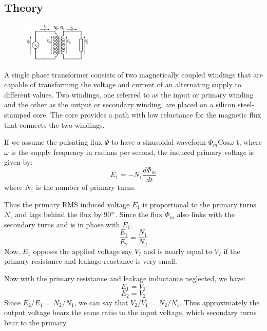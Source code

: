 \documentclass{article}
\begin{document}
\subsection{Theory}
\begin{figure}
\includegraphics[width=0.3\textwidth]{img1.png}
\end{figure}
A single phase transformer consists of two magnetically coupled windings that are capable of transforming the voltage and current of an alternating supply to different values. Two windings, one referred to as the input or primary winding and the other as the output or secondary winding, are placed on a silicon steel-stamped core. The core provides a path with low reluctance for the magnetic flux that connects the two windings.\par
If we assume the pulsating flux $\Phi$ to have a sinusoidal waveform $\Phi_{m}$Cos$\omega$ t, where $\omega$ is the supply frequency in radians per second, the induced primary voltage is given by:\\
\begin{equation}
    E_{1} = -N_{1}\frac{d\Phi_{m}}{dt}
\end{equation}
where $N_{1}$ is the number of primary turns.\par
Thus the primary RMS induced voltage $E_{1}$ is proportional to the primary turns $N_{1}$ and 
lags behind the flux by 90$\degree$. Since the flux $\Phi_{m}$ also links with the secondary turns and is in phase with $E_{1}$.\\
\begin{equation}
    \frac{E_{1}}{E_{2}}=\frac{N_{1}}{N_{2}}
\end{equation}
Now, $E_{1}$ opposes the applied voltage say $V_{I}$ and is nearly equal to $V_{I}$ if the primary 
resistance and leakage reactance is very small.\par
Now with the primary resistance and leakage inductance neglected, we have:
\begin{equation}
    E_{1}=V_{1}
\end{equation}
\begin{equation}
    E_{2}=V_{2}
\end{equation}
Since $E_{2}$/$E_{1}$ = $N_{2}$/$N_{1}$, we can say that $V_{2}$/$V_{1}$ = $N_{2}$/$N_{1}$. Thus approximately the output voltage bears the same ratio to the input voltage, which secondary turns bear to the primary 
\end{document}
